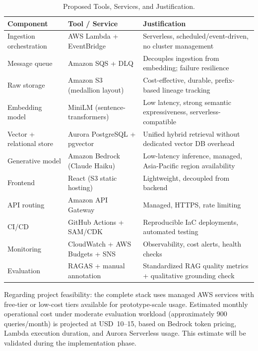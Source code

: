 \documentclass[12pt,a4paper]{report}
\begin{document}
\begin{table}[H]
\caption{Proposed Tools, Services, and Justification.}
\label{tab:tools}
\centering
\begin{tabular}{p{3.2cm}p{3.2cm}p{6.6cm}}
\toprule
\textbf{Component} & \textbf{Tool / Service} & \textbf{Justification} \\
\midrule
Ingestion orchestration & AWS Lambda + EventBridge & Serverless, scheduled/event-driven, no cluster management \\
Message queue & Amazon SQS + DLQ & Decouples ingestion from embedding; failure resilience \\
Raw storage & Amazon S3 (medallion layout) & Cost-effective, durable, prefix-based lineage tracking \\
Embedding model & MiniLM (sentence-transformers) & Low latency, strong semantic expressiveness, serverless-compatible \\
Vector + relational store & Aurora PostgreSQL + pgvector & Unified hybrid retrieval without dedicated vector DB overhead \\
Generative model & Amazon Bedrock (Claude Haiku) & Low-latency inference, managed, Asia-Pacific region availability \\
Frontend & React (S3 static hosting) & Lightweight, decoupled from backend \\
API routing & Amazon API Gateway & Managed, HTTPS, rate limiting \\
CI/CD & GitHub Actions + SAM/CDK & Reproducible IaC deployments, automated testing \\
Monitoring & CloudWatch + AWS Budgets + SNS & Observability, cost alerts, health checks \\
Evaluation & RAGAS + manual annotation & Standardized RAG quality metrics + qualitative grounding check \\
\bottomrule
\end{tabular}
\end{table}

Regarding project feasibility: the complete stack uses managed AWS services with free-tier or low-cost tiers available for prototype-scale usage. Estimated monthly operational cost under moderate evaluation workload (approximately 900 queries/month) is projected at USD~10--15, based on Bedrock token pricing, Lambda execution duration, and Aurora Serverless usage. This estimate will be validated during the implementation phase.

\end{document}
